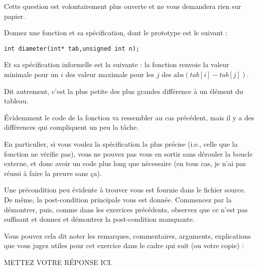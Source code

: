 \documentclass[11pt,answers]{exam}
\begin{document}
\begin{questions}
    Cette question est volontairement plus ouverte et ne vous demandera rien sur papier.

    Donnez une fonction et sa spécification, dont le prototype est le suivant :
\begin{lstlisting}
int diameter(int* tab,unsigned int n);
\end{lstlisting}

    Et sa spécification informelle est la suivante :
    la fonction renvoie la valeur minimale pour un $i$ des valeur maximale pour les $j$ des $\mathrm{abs}(tab[i]-tab[j])$.

    Dit autrement, c’est la plus petite des plus grandes différence à un élément du tableau.

    Évidemment le code de la fonction va ressembler au cas précédent, mais il y a des différences qui compliquent un peu la tâche.

    En particulier, si vous voulez la spécification la plus précise (i.e., celle que la fonction  ne vérifie pas), vous ne pouvez pas vous en sortir sans dérouler la boucle externe, et donc avoir un code plus long que nécessaire (en tous cas, je n’ai pas réussi à faire la preuve sans ça).

    Une précondition peu évidente à trouver vous est fournie dans le fichier source.
    De même, la post-condition principale vous est donnée. Commencez par la démontrer, puis, comme dans les exercices précédents, observez que ce n’est pas suffisant et donnez et démontrez la post-condition manquante.

    Vous pouvez cela dit noter les remarques, commentaires, arguments, explications que vous jugez utiles pour cet exercice dans le cadre qui suit (ou votre copie) :

    \begin{solutionorbox}
        METTEZ VOTRE RÉPONSE ICI.
    \end{solutionorbox}


\end{questions}
\end{document}
